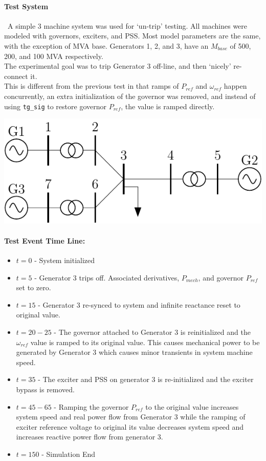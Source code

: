 \documentclass[12pt]{article}
\begin{document}
\onehalfspacing

\paragraph{Test System}\ A simple 3 machine system was used for `un-trip' testing.
All machines were modeled with governors, exciters, and PSS.
Most model parameters are the same, with the exception of MVA base.
Generators 1, 2, and 3, have an $M_{base}$ of 500, 200, and 100 MVA respectively. \\
The experimental goal was to trip Generator 3 off-line, and then `nicely' re-connect it.\\

This is different from the previous test in that ramps of $P_{ref}$ and $\omega_{ref}$ happen concurrently, an extra initialization of the governor was removed, and instead of using \verb|tg_sig| to restore governor $P_{ref}$, the value is ramped directly.

\begin{center}
\includegraphics[width=.6\linewidth]{200831-3mach7bus}
\end{center}

\paragraph{Test Event Time Line:}
\begin{itemize}
 em
\item $t=0$ - System initialized
\item $t=5$ - Generator 3 trips off.
Associated derivatives, $P_{mech}$, and governor $P_{ref}$ set to zero.
\item $t=15$ - Generator 3 re-synced to system and infinite reactance reset to original value. 

\item $t=20-25$ - The governor attached to Generator 3 is reinitialized and the $\omega_{ref}$ value is ramped to its original value. 
This causes mechanical power to be generated by Generator 3 which causes minor transients in system machine speed.
\item $t=35$ - The exciter and PSS on generator 3 is re-initialized and the exciter bypass is removed.
\item $t=45-65$ - Ramping the governor $P_{ref}$ to the original value increases system speed  and real power flow from Generator 3 while the ramping of exciter reference voltage to original its value decreases system speed and increases reactive power flow from generator 3.
\item $t=150$ - Simulation End
\end{itemize}
\end{document}
